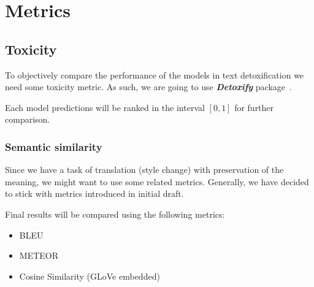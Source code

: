 \section{Metrics}

\subsection{Toxicity}

To objectively compare the performance of the models in text detoxification we
need some toxicity metric. As such, we are going to use
\textbf{\textit{Detoxify}} package~\cite{}.

Each model predictions will be ranked in the interval \([0, 1]\) for further
comparison.

\subsubsection{Semantic similarity}

Since we have a task of translation (style change) with preservation of the
meaning, we might want to use some related metrics. Generally, we have decided
to stick with metrics introduced in initial draft.

Final results will be compared using the following metrics:

\begin{itemize}
    \item BLEU
    \item METEOR
    \item Cosine Similarity (GLoVe embedded)
\end{itemize}